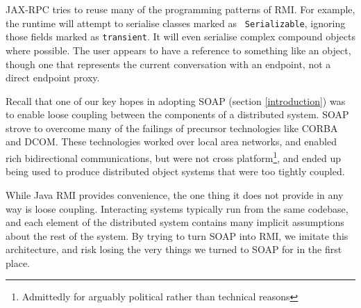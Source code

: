 JAX-RPC tries to reuse many of the programming patterns of RMI. For
example, the runtime will attempt to serialise classes marked as {\tt
Serializable}, ignoring those fields marked as {\tt transient}. It
will even serialise complex compound objects where possible. The user
appears to have a reference to something like an object, though one
that represents the current conversation with an endpoint, not a
direct endpoint proxy.

Recall that one of our key hopes in adopting SOAP (section \ref{introduction})
was to enable loose coupling between the components of a distributed system.
SOAP strove to overcome many of the failings of precursor technologies like
CORBA and DCOM. These technologies worked over local area networks, and
enabled rich bidirectional communications, but were not cross
platform\footnote{Admittedly for arguably political rather than technical
reasons}, and ended up being used to produce distributed object systems that
were too tightly coupled.

While Java RMI provides convenience, the one thing it does not provide
in any way is loose coupling. Interacting systems typically run from
the same codebase, and each element of the distributed system contains
many implicit assumptions about the rest of the system. By trying to
turn SOAP into RMI, we imitate this architecture, and risk losing the
very things we turned to SOAP for in the first place.





